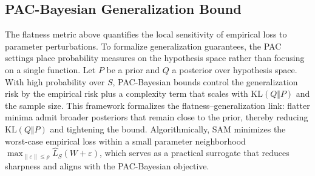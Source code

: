 \documentclass{article} %
\begin{document}









\subsection{PAC-Bayesian Generalization Bound}


The flatness metric above quantifies the local sensitivity of empirical loss to parameter perturbations. To formalize generalization guarantees, the PAC settings place probability measures on the hypothesis space rather than focusing on a single function. Let $P$ be a prior and $Q$ a posterior over hypothesis space. With high probability over $S$, PAC-Bayesian bounds control the generalization risk  by the empirical risk plus a complexity term that scales with $\mathrm{KL}(Q\Vert P)$ and the sample size\cite{shawe1997pac,mcallesterPACBayesianStochasticModel2003}. 
This framework formalizes the flatness–generalization link: flatter minima admit broader posteriors that remain close to the prior, thereby reducing $\mathrm{KL}(Q\Vert P)$ and tightening the bound. Algorithmically, SAM minimizes the worst-case empirical loss within a small parameter neighborhood $\max_{\|\varepsilon\|\le\rho}\hat L_{S}(W+\varepsilon)$, which serves as a practical surrogate that reduces sharpness and aligns with the PAC-Bayesian objective\cite{foretSharpnessAwareMinimizationEfficiently2021}.
\end{document}
